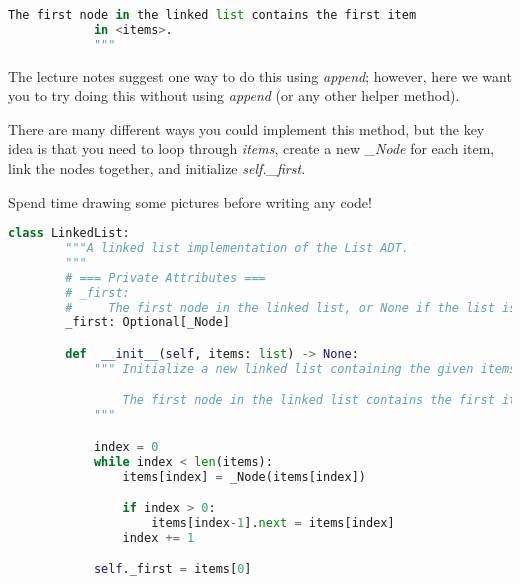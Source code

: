 \documentclass[12pt]{article}
\begin{document}
\begin{enumerate}[1.]
\begin{lstlisting}[language=python]
            The first node in the linked list contains the first item
            in <items>.
            """
    \end{lstlisting}

    \bigskip

    The lecture notes suggest one way to do this using \textit{append}; however,
    here we want you to try doing this without using \textit{append} (or any other helper
    method).

    \bigskip

    There are many different ways you could implement this method, but the key idea
    is that you need to loop through \textit{items}, create a new \textit{\_Node} for each
    item, link the nodes together, and initialize \textit{self.\_first}.

    \bigskip

    Spend time drawing some pictures before writing any code!

    \bigskip

    \begin{mdframed}
    \begin{lstlisting}[language=python,caption={task\_1\_step\_3\_solution.py}]
    class LinkedList:
        """A linked list implementation of the List ADT.
        """
        # === Private Attributes ===
        # _first:
        #     The first node in the linked list, or None if the list is empty.
        _first: Optional[_Node]

        def  __init__(self, items: list) -> None:
            """ Initialize a new linked list containing the given items.

                The first node in the linked list contains the first item in <items>
            """

            index = 0
            while index < len(items):
                items[index] = _Node(items[index])

                if index > 0:
                    items[index-1].next = items[index]
                index += 1

            self._first = items[0]
    \end{lstlisting}
    \end{mdframed}

\end{enumerate}
\end{document}

